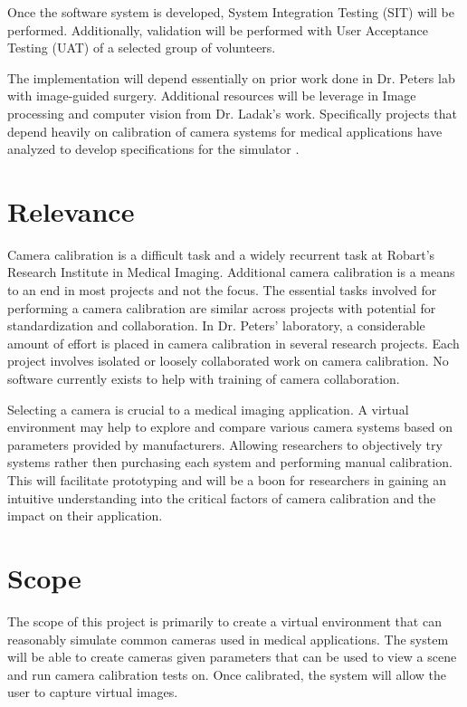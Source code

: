 \documentclass[11pt]{report}
\begin{document}
Once the software system is developed, System Integration Testing (SIT) will be performed. Additionally, validation will be performed with User Acceptance Testing (UAT) of a selected group of volunteers. 

The implementation will depend essentially on prior work done in Dr. Peters lab with image-guided surgery. Additional resources will be leverage in Image processing and computer vision from Dr. Ladak's work. Specifically projects that depend heavily on calibration of camera systems for medical applications have analyzed to develop specifications for the simulator \cite{CC}. 
 

\section{Relevance}

Camera calibration is a difficult task and a widely recurrent task at Robart's Research Institute in Medical Imaging. Additional camera calibration is a means to an end in most projects and not the focus. The essential tasks involved for performing a camera calibration are similar across projects with potential for standardization and collaboration. In Dr. Peters' laboratory, a considerable amount of effort is placed in camera calibration in several research projects. Each project involves isolated or loosely collaborated work on camera calibration. No software currently exists to help with training of camera collaboration. 

Selecting a camera is crucial to a medical imaging application. A virtual environment may help to explore and compare various camera systems based on parameters provided by manufacturers. Allowing researchers to objectively try systems rather then purchasing each system and performing manual calibration. This will facilitate prototyping and will be a boon for researchers in  gaining an intuitive understanding into the critical factors of camera calibration and the impact on their application. 

\section{Scope}
The scope of this project is primarily to create a virtual environment that can reasonably simulate common cameras used in medical applications. The system will be able to create cameras given parameters that can be used to view a scene and run camera calibration tests on. Once calibrated, the system will allow the user to capture virtual images. 
 
\end{document}
